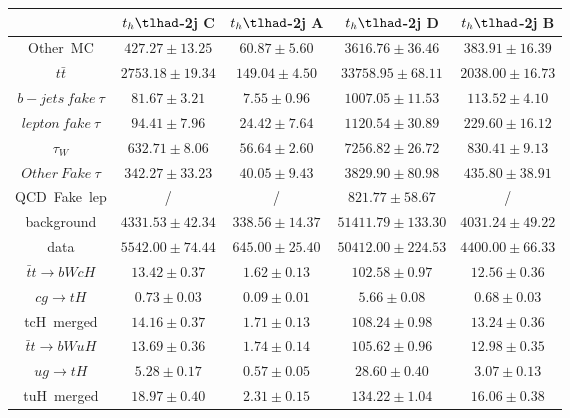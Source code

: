 \begin{tabular}{|c|c|c|c|c|} \hline
 & $t_{h}\tlhad$-2j C & $t_{h}\tlhad$-2j A & $t_{h}\tlhad$-2j D & $t_{h}\tlhad$-2j B\\\hline
Other~MC & $427.27\pm13.25$ & $60.87\pm5.60$ & $3616.76\pm36.46$ & $383.91\pm16.39$\\\hline
$t\bar{t}$ & $2753.18\pm19.34$ & $149.04\pm4.50$ & $33758.95\pm68.11$ & $2038.00\pm16.73$\\\hline
$b-jets~fake~\tau$ & $81.67\pm3.21$ & $7.55\pm0.96$ & $1007.05\pm11.53$ & $113.52\pm4.10$\\\hline
$lepton~fake~\tau$ & $94.41\pm7.96$ & $24.42\pm7.64$ & $1120.54\pm30.89$ & $229.60\pm16.12$\\\hline
$\tau_{W}$ & $632.71\pm8.06$ & $56.64\pm2.60$ & $7256.82\pm26.72$ & $830.41\pm9.13$\\\hline
$Other~Fake~\tau$ & $342.27\pm33.23$ & $40.05\pm9.43$ & $3829.90\pm80.98$ & $435.80\pm38.91$\\\hline
QCD~Fake~lep &  / &  / & $821.77\pm58.67$ &  /\\\hline
background & $4331.53\pm42.34$ & $338.56\pm14.37$ & $51411.79\pm133.30$ & $4031.24\pm49.22$\\\hline
data & $5542.00\pm74.44$ & $645.00\pm25.40$ & $50412.00\pm224.53$ & $4400.00\pm66.33$\\\hline
$\bar{t}t\to bWcH$ & $13.42\pm0.37$ & $1.62\pm0.13$ & $102.58\pm0.97$ & $12.56\pm0.36$\\\hline
$cg\to tH$ & $0.73\pm0.03$ & $0.09\pm0.01$ & $5.66\pm0.08$ & $0.68\pm0.03$\\\hline
tcH~merged & $14.16\pm0.37$ & $1.71\pm0.13$ & $108.24\pm0.98$ & $13.24\pm0.36$\\\hline
$\bar{t}t\to bWuH$ & $13.69\pm0.36$ & $1.74\pm0.14$ & $105.62\pm0.96$ & $12.98\pm0.35$\\\hline
$ug\to tH$ & $5.28\pm0.17$ & $0.57\pm0.05$ & $28.60\pm0.40$ & $3.07\pm0.13$\\\hline
tuH~merged & $18.97\pm0.40$ & $2.31\pm0.15$ & $134.22\pm1.04$ & $16.06\pm0.38$\\\hline
\end{tabular}
